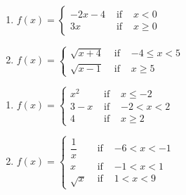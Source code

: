 \begin{multicols}{2}
\begin{enumerate}
\setcounter{enumi}{\value{HW}}

\item ${\displaystyle f(x) = \left\{ \begin{array}{rcl} -2x - 4 & \mbox{ if } &  x < 0 \\
                                                             3x & \mbox{ if } & x \geq 0 
                                     \end{array} \right. }$

\item ${\displaystyle f(x) = \left\{ \begin{array}{rcl} \sqrt{x + 4} & \mbox{ if } & -4 \leq x < 5 \\
                                                        \sqrt{x - 1} & \mbox{ if } & x \geq 5
                                     \end{array} \right. }$

\setcounter{HW}{\value{enumi}}
\end{enumerate}
\end{multicols}

\begin{multicols}{2}
\begin{enumerate}
\setcounter{enumi}{\value{HW}}


\item ${\displaystyle f(x) = \left\{ \begin{array}{rcl} x^{2} & \mbox{ if } & x \leq -2 \\
                                                        3 - x & \mbox{ if } & -2 < x < 2 \\
                                                            4 & \mbox{ if } & x \geq 2  
                                     \end{array} \right. }$

\item ${\displaystyle f(x) = \left\{ \begin{array}{rcl} \dfrac{1}{x} & \mbox{ if } & -6 < x < -1\\
                                                                  x & \mbox{ if } & -1 < x < 1 \\
                                                           \sqrt{x} & \mbox{ if } & 1 < x < 9  
                                     \end{array} \right. }$ \label{sketchpiecelast}

\setcounter{HW}{\value{enumi}}
\end{enumerate}
\end{multicols}

